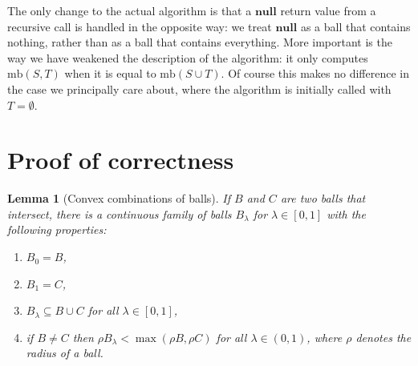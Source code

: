 \documentclass[a4paper]{article}
\newtheorem{lemma}{Lemma}[section]
\newcommand\undef{\mathbf{null}}
\newcommand\mb{\mathrm{mb}}
\let\boundary\partial
\let\radius\rho
\begin{document}
\noindent The only change to the actual algorithm is that a $\undef$ return value from a recursive call is handled in the opposite way: we treat $\undef$ as a ball that contains nothing, rather than as a ball that contains everything. More important is the way we have weakened the description of the algorithm: it only computes $\mb(S, T)$ when it is equal to $\mb(S\cup T)$. Of course this makes no difference in the case we principally care about, where the algorithm is initially called with $T=\emptyset$.

\section{Proof of correctness}
\begin{lemma}[Convex combinations of balls]\label{lemma:cc}
  If $B$ and $C$ are two balls that intersect, there is a continuous family of balls $B_\lambda$ for $\lambda\in[0,1]$ with the following properties:
  \def\theenumi{\normalfont\roman{enumi})}\let\labelenumi\theenumi
  \begin{enumerate}
    \item\label{item:cc:0} $B_0=B$,
    \item\label{item:cc:1} $B_1=C$,
    \item\label{item:cc:intersection} $B_\lambda\subseteq B\cup C$ for all $\lambda\in[0,1]$,
    \item\label{item:cc:radius} if $B\neq C$ then $\radius B_\lambda < \max(\radius B, \radius C)$ for all $\lambda\in(0,1)$, where $\radius$ denotes the radius of a ball.
  \end{enumerate}
\end{lemma}
\end{document}
